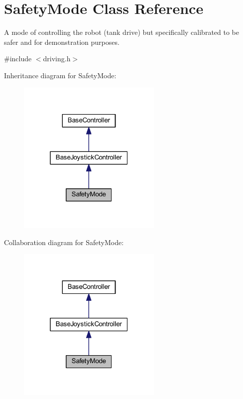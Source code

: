 \hypertarget{class_safety_mode}{\section{\-Safety\-Mode \-Class \-Reference}
\label{class_safety_mode}
}


\-A mode of controlling the robot (tank drive) but specifically calibrated to be safer and for demonstration purposes.  




{\ttfamily \#include $<$driving.\-h$>$}



\-Inheritance diagram for \-Safety\-Mode\-:\nopagebreak
\begin{figure}[H]
\begin{center}
\leavevmode
\includegraphics[width=196pt]{class_safety_mode__inherit__graph}
\end{center}
\end{figure}


\-Collaboration diagram for \-Safety\-Mode\-:\nopagebreak
\begin{figure}[H]
\begin{center}
\leavevmode
\includegraphics[width=196pt]{class_safety_mode__coll__graph}
\end{center}
\end{figure}
